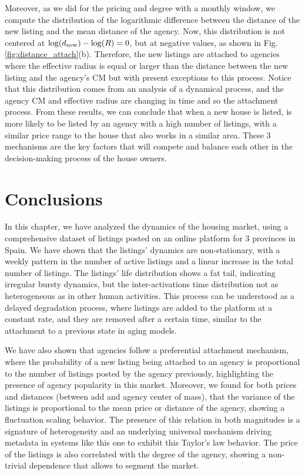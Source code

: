 Moreover, as we did for the pricing and degree with a monthly window, we compute the distribution of the logarithmic difference between the distance of the new listing and the mean distance of the agency. Now, this distribution is not centered at $\log(d_{\rm new}) - \log(R) = 0$, but at negative values, as shown in Fig. \ref{fig:distance_attach}(b). Therefore, the new listings are attached to agencies where the effective radius is equal or larger than the distance between the new listing and the agency's CM but with present exceptions to this process. Notice that this distribution comes from an analysis of a dynamical process, and the agency CM and effective radius are changing in time and so the attachment process. From these results, we can conclude that when a new house is listed, is more likely to be listed by an agency with a high number of listings, with a similar price range to the house that also works in a similar area. These 3 mechanisms are the key factors that will compete and balance each other in the decision-making process of the house owners.

\section{Conclusions}

In this chapter, we have analyzed the dynamics of the housing market, using a comprehensive dataset of listings posted on an online platform for 3 provinces in Spain. We have shown that the listings' dynamics are non-stationary, with a weekly pattern in the number of active listings and a linear increase in the total number of listings. The listings' life distribution shows a fat tail, indicating irregular bursty dynamics, but the inter-activations time distribution not as heterogeneous as in other human activities. This process can be understood as a delayed degradation process, where listings are added to the platform at a constant rate, and they are removed after a certain time, similar to the attachment to a previous state in aging models. 

We have also shown that agencies follow a preferential attachment mechanism, where the probability of a new listing being attached to an agency is proportional to the number of listings posted by the agency previously, highlighting the presence of agency popularity in this market. Moreover, we found for both prices and distances (between add and agency center of mass), that the variance of the listings is proportional to the mean price or distance of the agency, showing a fluctuation scaling behavior. The presence of this relation in both magnitudes is a signature of heterogeneity and an underlying universal mechanism driving metadata in systems like this one to exhibit this Taylor's law behavior. The price of the listings is also correlated with the degree of the agency, showing a non-trivial dependence that allows to segment the market. 

